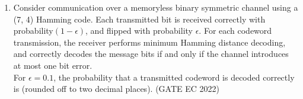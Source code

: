 \begin{enumerate}[label=\thechapter.\arabic*,ref=\thechapter.\theenumi]
\item Consider communication over a memoryless binary symmetric channel using a
(7, 4) Hamming code. Each transmitted bit is received correctly with probability$(1 - \epsilon)$, and flipped with probability $\epsilon$. For each codeword transmission, the receiver
performs minimum Hamming distance decoding, and correctly decodes the message
bits if and only if the channel introduces at most one bit error.
\\For $\epsilon = 0.1$, the probability that a transmitted codeword is decoded correctly is
 \textunderscore\textunderscore\textunderscore\textunderscore\textunderscore\textunderscore (rounded off to two decimal places).
\hfill (GATE EC 2022)
\\

\end{enumerate}
